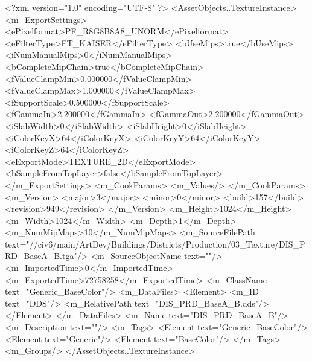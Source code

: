 <?xml version="1.0" encoding="UTF-8" ?>
<AssetObjects..TextureInstance>
	<m_ExportSettings>
		<ePixelformat>PF_R8G8B8A8_UNORM</ePixelformat>
		<eFilterType>FT_KAISER</eFilterType>
		<bUseMips>true</bUseMips>
		<iNumManualMips>0</iNumManualMips>
		<bCompleteMipChain>true</bCompleteMipChain>
		<fValueClampMin>0.000000</fValueClampMin>
		<fValueClampMax>1.000000</fValueClampMax>
		<fSupportScale>0.500000</fSupportScale>
		<fGammaIn>2.200000</fGammaIn>
		<fGammaOut>2.200000</fGammaOut>
		<iSlabWidth>0</iSlabWidth>
		<iSlabHeight>0</iSlabHeight>
		<iColorKeyX>64</iColorKeyX>
		<iColorKeyY>64</iColorKeyY>
		<iColorKeyZ>64</iColorKeyZ>
		<eExportMode>TEXTURE_2D</eExportMode>
		<bSampleFromTopLayer>false</bSampleFromTopLayer>
	</m_ExportSettings>
	<m_CookParams>
		<m_Values/>
	</m_CookParams>
	<m_Version>
		<major>3</major>
		<minor>0</minor>
		<build>157</build>
		<revision>949</revision>
	</m_Version>
	<m_Height>1024</m_Height>
	<m_Width>1024</m_Width>
	<m_Depth>1</m_Depth>
	<m_NumMipMaps>10</m_NumMipMaps>
	<m_SourceFilePath text="//civ6/main/ArtDev/Buildings/Districts/Production/03_Texture/DIS_PRD_BaseA_B.tga"/>
	<m_SourceObjectName text=""/>
	<m_ImportedTime>0</m_ImportedTime>
	<m_ExportedTime>72758258</m_ExportedTime>
	<m_ClassName text="Generic_BaseColor"/>
	<m_DataFiles>
		<Element>
			<m_ID text="DDS"/>
			<m_RelativePath text="DIS_PRD_BaseA_B.dds"/>
		</Element>
	</m_DataFiles>
	<m_Name text="DIS_PRD_BaseA_B"/>
	<m_Description text=""/>
	<m_Tags>
		<Element text="Generic_BaseColor"/>
		<Element text="Generic"/>
		<Element text="BaseColor"/>
	</m_Tags>
	<m_Groups/>
</AssetObjects..TextureInstance>

